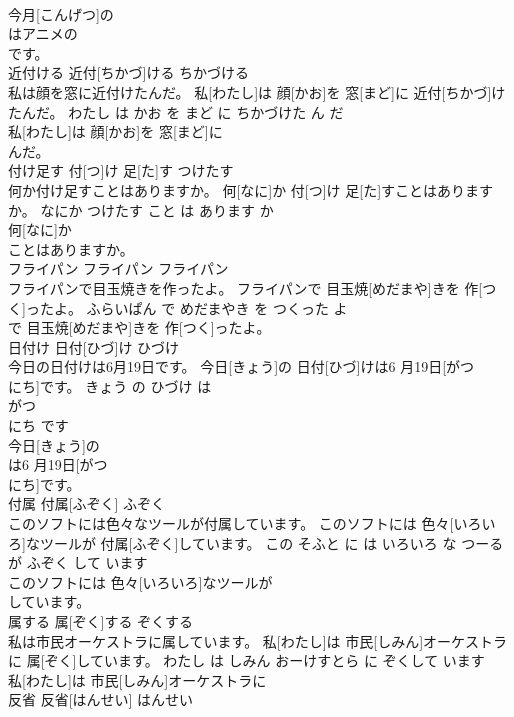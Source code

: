 \documentclass[8pt]{extreport}
\begin{document}
\begin{CJK}{UTF8}{min}
\\	今月[こんげつ]の
\\	はアニメの 
\\	[でぃーぶぃーでぃー]です。			
\\	近付ける	近付[ちかづ]ける	ちかづける	
\\	私は顔を窓に近付けたんだ。	私[わたし]は 顔[かお]を 窓[まど]に 近付[ちかづ]けたんだ。	わたし は かお を まど に ちかづけた ん だ	
\\	私[わたし]は 顔[かお]を 窓[まど]に
\\	んだ。			
\\	付け足す	付[つ]け 足[た]す	つけたす	
\\	何か付け足すことはありますか。	何[なに]か 付[つ]け 足[た]すことはありますか。	なにか つけたす こと は あります か	
\\	何[なに]か
\\	ことはありますか。			
\\	フライパン	フライパン	フライパン	
\\	フライパンで目玉焼きを作ったよ。	フライパンで 目玉焼[めだまや]きを 作[つく]ったよ。	ふらいぱん で めだまやき を つくった よ	
\\	で 目玉焼[めだまや]きを 作[つく]ったよ。			
\\	日付け	日付[ひづ]け	ひづけ	
\\	今日の日付けは6月19日です。	今日[きょう]の 日付[ひづ]けは6 月19日[がつ 
\\	にち]です。	きょう の ひづけ は 
\\	がつ 
\\	にち です	
\\	今日[きょう]の
\\	は6 月19日[がつ 
\\	にち]です。			
\\	付属	付属[ふぞく]	ふぞく	
\\	このソフトには色々なツールが付属しています。	このソフトには 色々[いろいろ]なツールが 付属[ふぞく]しています。	この そふと に は いろいろ な つーる が ふぞく して います	
\\	このソフトには 色々[いろいろ]なツールが
\\	しています。			
\\	属する	属[ぞく]する	ぞくする	
\\	私は市民オーケストラに属しています。	私[わたし]は 市民[しみん]オーケストラに 属[ぞく]しています。	わたし は しみん おーけすとら に ぞくして います	
\\	私[わたし]は 市民[しみん]オーケストラに
\\	反省	反省[はんせい]	はんせい	

\end{CJK}
\end{document}
